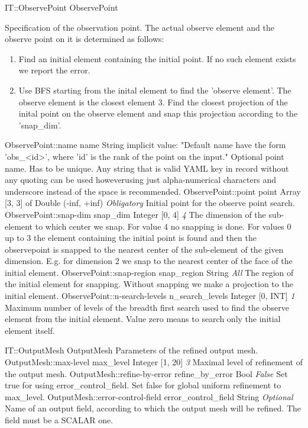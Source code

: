 \begin{RecordType}
	{IT::ObservePoint}
	{ObservePoint}
	{} %
	{} %
	{{{{Specification of the observation point. The actual observe element and the observe point on it is determined as follows:}
}
\begin{enumerate}
\item {Find an initial element containing the initial point. If no such element exists we report the error.}
\item {Use BFS starting from the inital element to find the 'observe element'. The observe element is the closest element 3. Find the closest projection of the inital point on the observe element and snap this projection according to the 'snap{\_}dim'.}
\end{enumerate}
}}
		\RecKey
			{ObservePoint::name}
			{name}
			{{String}}
			{implicit value: "{Default name have the form 'obs{\_}{\textless}id{\textgreater}', where 'id' is the rank of the point on the input.}"}
			{{{Optional point name. Has to be unique. Any string that is valid YAML key in record without any quoting can be used howeverusing just alpha-numerical characters and underscore instead of the space is recommended. }}}
		\RecKey
			{ObservePoint::point}
			{point}
			{{Array [3, 3] of }{Double (-inf, +inf)}}
			{ \it{Obligatory} }
			{{{Initial point for the observe point search.}}}
		\RecKey
			{ObservePoint::snap-dim}
			{snap{\_}dim}
			{{Integer [0, 4]}}
			{ \it{4} }
			{{{The dimension of the sub-element to which center we snap. For value 4 no snapping is done. For values 0 up to 3 the element containing the initial point is found and then the observepoint is snapped to the nearest center of the sub-element of the given dimension. E.g. for dimension 2 we snap to the nearest center of the face of the initial element.}}}
		\RecKey
			{ObservePoint::snap-region}
			{snap{\_}region}
			{{String}}
			{ \it{All} }
			{{{The region of the initial element for snapping. Without snapping we make a projection to the initial element.}}}
		\RecKey
			{ObservePoint::n-search-levels}
			{n{\_}search{\_}levels}
			{{Integer [0, INT]}}
			{ \it{1} }
			{{{Maximum number of levels of the breadth first search used to find the observe element from the initial element. Value zero means to search only the initial element itself.}}}
\end{RecordType}
\begin{RecordType}
	{IT::OutputMesh}
	{OutputMesh}
	{} %
	{} %
	{{{Parameters of the refined output mesh.}}}
		\RecKey
			{OutputMesh::max-level}
			{max{\_}level}
			{{Integer [1, 20]}}
			{ \it{3} }
			{{{Maximal level of refinement of the output mesh.}}}
		\RecKey
			{OutputMesh::refine-by-error}
			{refine{\_}by{\_}error}
			{{Bool}}
			{ \it{False} }
			{{{Set true for using error{\_}control{\_}field. Set false for global uniform refinement to max{\_}level.}}}
		\RecKey
			{OutputMesh::error-control-field}
			{error{\_}control{\_}field}
			{{String}}
			{ \it{Optional} }
			{{{Name of an output field, according to which the output mesh will be refined. The field must be a SCALAR one.}}}
\end{RecordType}
